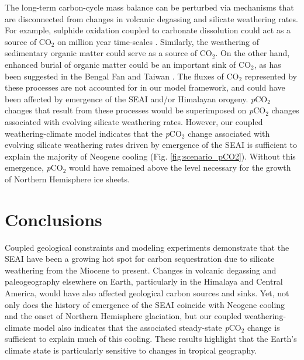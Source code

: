 \documentclass[9pt,twocolumn,twoside,lineno]{pnas-new}
\newcommand{\pCOtwo}{\textit{p}CO$_{2}$\xspace}
\newcommand{\COtwo}{CO$_{2}$\xspace}
\begin{document}
The long-term carbon-cycle mass balance can be perturbed via mechanisms that are disconnected from changes in volcanic degassing and silicate weathering rates. For example, sulphide oxidation coupled to carbonate dissolution could act as a source of \COtwo on million year time-scales \cite{Torres2014a}. Similarly, the weathering of sedimentary organic matter could serve as a source of \COtwo \cite{Hilton2014a}. On the other hand, enhanced burial of organic matter could be an important sink of \COtwo, as has been suggested in the Bengal Fan \cite{Galy2007a} and Taiwan \cite{Kao2014a}. The fluxes of \COtwo represented by these processes are not accounted for in our model framework, and could have been affected by emergence of the SEAI and/or Himalayan orogeny. \pCOtwo changes that result from these processes would be superimposed on \pCOtwo changes associated with evolving silicate weathering rates. However, our coupled weathering-climate model indicates that the \pCOtwo change associated with evolving silicate weathering rates driven by emergence of the SEAI is sufficient to explain the majority of Neogene cooling (Fig. \ref{fig:scenario_pCO2}). Without this emergence, \pCOtwo would have remained above the level necessary for the growth of Northern Hemisphere ice sheets.

\section*{Conclusions}

Coupled geological constraints and modeling experiments demonstrate that the SEAI have been a growing hot spot for carbon sequestration due to silicate weathering from the Miocene to present. Changes in volcanic degassing and paleogeography elsewhere on Earth, particularly in the Himalaya and Central America, would have also affected geological carbon sources and sinks. Yet, not only does the history of emergence of the SEAI coincide with Neogene cooling and the onset of Northern Hemisphere glaciation, but our coupled weathering-climate model also indicates that the associated steady-state \pCOtwo change is sufficient to explain much of this cooling. These results highlight that the Earth's climate state is particularly sensitive to changes in tropical geography.
\end{document}
